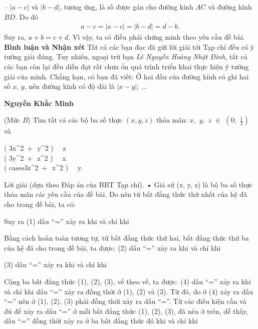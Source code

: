 \begin{multicols}{2}
	\vskip 0.05cm
	-- $|a - c|$ và $|b - d|$, tương ứng, là số được gán cho đường kính $AC$ và đường kính $BD$. Do đó
	\begin{align*}
		a - c = |a - c| = |b - d| = d - b.
	\end{align*}
	Suy ra, $a + b = c + d$.
	\vskip 0.05cm
	Vì vậy, ta có điều phải chứng minh theo yêu cầu đề bài.
	\vskip 0.05cm
	\textbf{Bình luận và Nhận xét}
	\vskip 0.05cm
	Tất cả các bạn đọc đã gửi lời giải tới Tạp chí đều có ý tưởng giải đúng. Tuy nhiên, ngoại trừ bạn \textit{Lê Nguyễn Hoàng Nhật Đình}, tất cả các bạn còn lại đều diễn đạt rất chưa ổn quá trình triển khai thực hiện ý tưởng giải của mình. Chẳng hạn, có bạn đã viết: Ở hai đầu của đường kính có ghi hai số $x$, $y$, nên đường kính có độ dài là $|x - y|$; ...
	\begin{flushright}
		\textbf{Nguyễn Khắc Minh}
	\end{flushright}
	{}
	(Mức $B$) Tìm tất cả các bộ ba số thực $(x, y, z)$ thỏa mãn: $x,\,\,y,\,\,z\,\, \in \,\,\left( {0;\,\,\frac{1}{2}} \right)$  và
	\begin{cases}
			\left( {3{x^2}\, + \,\,{y^2}} \right)  \,\, \ge \,\,z\\
			\left( {3{y^2}\, + \,\,{z^2}} \right) \,\, \ge \,\,x\\
			\left( {cases3{z^2}\, + \,\,{x^2}} \right) \,\, \ge \,\,y.
	\end{cases}
	Lời giải (dựa theo Đáp án của BBT Tạp chí).
	• Giả sử (x, y, z) là bộ ba số thực thỏa mãn các yêu cầu của đề bài.
	Do   nên từ bất đẳng thức thứ nhất của hệ đã cho trong đề bài, ta có:
	
	Suy ra
	(1)
	dấu “=” xảy ra khi và chỉ khi
	
	Bằng cách hoàn toàn tương tự, từ bất đẳng thức thứ hai, bất đẳng thức thứ ba của hệ đã cho trong đề bài, ta được:
	(2)
	dấu “=” xảy ra khi và chỉ khi
	
	(3)
	dấu “=” xảy ra khi và chỉ khi
	
	Cộng ba bất đẳng thức (1), (2), (3), vế theo vế, ta được:
	(4)
	dấu “=” xảy ra khi và chỉ khi dấu “=” xảy ra đồng thời ở (1), (2) và (3).
	Từ đó, do ở (4) xảy ra dấu “=” nên ở (1), (2), (3) phải đồng thời xảy ra dấu “=”.
	Từ các điều kiện cần và đủ để xảy ra dấu “=” ở mỗi bất đẳng thức (1), (2), (3), đã nêu ở trên, dễ thấy, dấu “=” đồng thời xảy ra ở ba bất đẳng thức đó khi và chỉ khi
	

\end{multicols}
